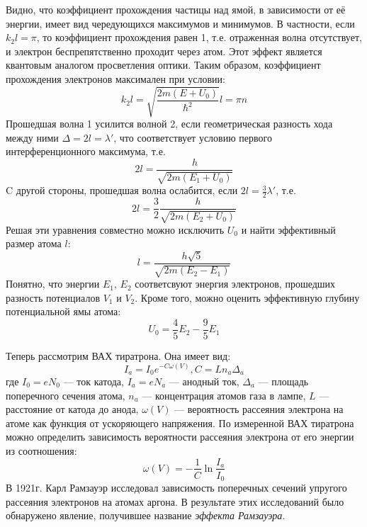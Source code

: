\documentclass[a4paper,12pt]{article}
\begin{document}
    Видно, что коэффициент прохождения частицы над ямой, в зависимости от её энергии, имеет вид чередующихся максимумов и минимумов. В частности, если $k_2l = \pi$, то коэффициент прохождения равен 1, т.е. отраженная волна отсутствует, и электрон беспрепятственно проходит через атом. Этот эффект является квантовым аналогом просветления оптики. Таким образом, коэффициент прохождения электронов максимален при условии:
    \begin{equation}
    k_2l = \sqrt{\frac{2m(E+U_0)}{\hbar^2}}l = \pi n
    \end{equation}
    Прошедшая волна 1 усилится волной 2, если геометрическая разность хода между ними $\Delta = 2l = \lambda'$, что соответствует условию первого интерференционного максимума, т.е.
    \begin{equation}
    2l = \frac{h}{\sqrt{2m(E_1 + U_0)}}
    \end{equation}
    C другой стороны, прошедшая волна ослабится, если $2l = \frac{3}{2}\lambda'$, т.е.
    \begin{equation}
    2l = \frac{3}{2}\frac{h}{\sqrt{2m(E_2+U_0)}}
    \end{equation}
    Решая эти уравнения совместно можно исключить $U_0$ и найти эффективный размер атома $l$:
    \begin{equation}
        l = \frac{h\sqrt{5}}{\sqrt{2m(E_2-E_1)}}
    \end{equation}
    Понятно, что энергии $E_1$, $E_2$ соответсвуют энергия электронов, прошедших разность потенциалов $V_1$ и $V_2$.
    Кроме того, можно оценить эффективную глубину потенциальной ямы атома:
    \begin{equation}
    U_0 =\frac{4}{5}E_2 - \frac{9}{5}E_1
    \end{equation}

    Теперь рассмотрим ВАХ тиратрона. Она имеет вид:
    $$
    I_a = I_0e^{-C\omega(V)}, C = Ln_a\Delta_a
    $$
    где $I_0 = eN_0$ --- ток катода, $I_a = eN_a$ --- анодный ток, $\Delta_a$ --- площадь поперечного сечения атома, $n_a$ --- концентрация атомов газа в лампе, $L$ --- расстояние от катода до анода, $\omega(V)$ --- вероятность рассеяния электрона на атоме как функция от ускоряющего напряжения. По измеренной ВАХ тиратрона можно определить зависимость вероятности рассеяния электрона от его энергии из соотношения:
    \begin{equation}
    \omega(V) = -\frac{1}{C}\ln\frac{I_a}{I_0}
    \end{equation}
    В 1921г. Карл Рамзауэр исследовал зависимость поперечных сечений упругого
    рассеяния электронов на атомах аргона. В результате этих исследований было обнаружено
    явление, получившее название \textit{эффекта Рамзауэра}.
\end{document}
